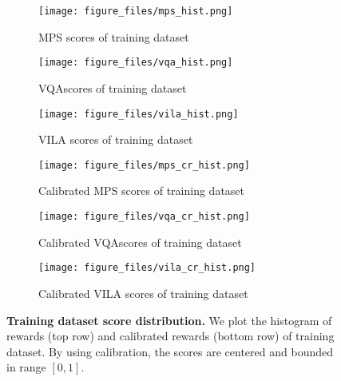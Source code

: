 \begin{figure}[t]
    \centering
    \begin{subfigure}[t]{0.32\columnwidth}
        \texttt{[image: figure\_files/mps\_hist.png]}
        \caption{MPS scores of training dataset}
        \label{fig:mps_train}
    \end{subfigure}
    \hfill
    \begin{subfigure}[t]{0.32\columnwidth}
        \centering
        \texttt{[image: figure\_files/vqa\_hist.png]}
        \caption{VQAscores of training dataset}
        \label{fig:vqa_train}
    \end{subfigure}
    \hfill
    \begin{subfigure}[t]{0.32\columnwidth}
        \centering\small
        \texttt{[image: figure\_files/vila\_hist.png]}
        \caption{VILA scores of training dataset}
        \label{fig:vila_train}
    \end{subfigure}
    \vfill
    \begin{subfigure}[t]{0.32\columnwidth}
        \texttt{[image: figure\_files/mps\_cr\_hist.png]}
        \caption{Calibrated MPS scores of training dataset}
        \label{fig:mps_cal_train}
    \end{subfigure}
    \hfill
    \begin{subfigure}[t]{0.32\columnwidth}
        \centering
        \texttt{[image: figure\_files/vqa\_cr\_hist.png]}
        \caption{Calibrated VQAscores of training dataset}
        \label{fig:vqa_cal_train}
    \end{subfigure}
    \hfill
    \begin{subfigure}[t]{0.32\columnwidth}
        \centering\small
        \texttt{[image: figure\_files/vila\_cr\_hist.png]}
        \caption{Calibrated VILA scores of training dataset}
        \label{fig:vila_cal_train}
    \end{subfigure}
    \vspace{-5pt}
    \caption{\textbf{Training dataset score distribution.} We plot the histogram of rewards (top row) and calibrated rewards (bottom row) of training dataset. By using calibration, the scores are centered and bounded in range $[0,1]$.} 
    \label{fig:dataset_statistic}
    \vspace{-10pt}
\end{figure}